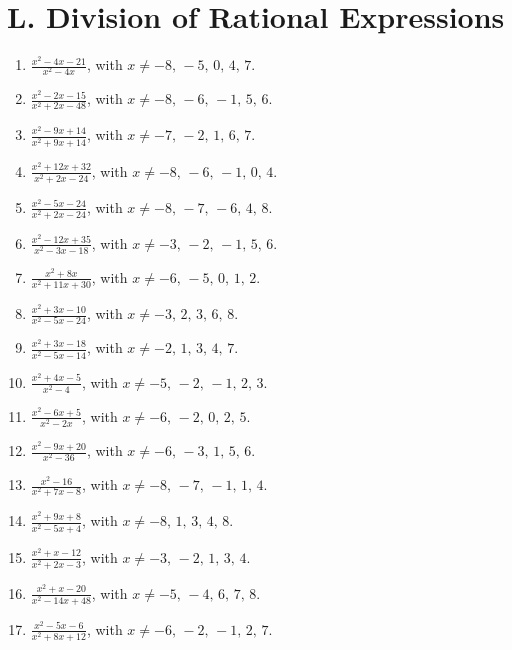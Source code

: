 \documentclass[11pt,oneside]{book}
\begin{document}
\section*{L. Division of Rational Expressions}
\begin{enumerate}[leftmargin=*,label=\textbf{L\arabic*.},itemsep=0.45\baselineskip]
\item $\displaystyle \frac{x^{2} - 4 x - 21}{x^{2} - 4 x}$, with $x\ne -8,\,-5,\,0,\,4,\,7$.
\item $\displaystyle \frac{x^{2} - 2 x - 15}{x^{2} + 2 x - 48}$, with $x\ne -8,\,-6,\,-1,\,5,\,6$.
\item $\displaystyle \frac{x^{2} - 9 x + 14}{x^{2} + 9 x + 14}$, with $x\ne -7,\,-2,\,1,\,6,\,7$.
\item $\displaystyle \frac{x^{2} + 12 x + 32}{x^{2} + 2 x - 24}$, with $x\ne -8,\,-6,\,-1,\,0,\,4$.
\item $\displaystyle \frac{x^{2} - 5 x - 24}{x^{2} + 2 x - 24}$, with $x\ne -8,\,-7,\,-6,\,4,\,8$.
\item $\displaystyle \frac{x^{2} - 12 x + 35}{x^{2} - 3 x - 18}$, with $x\ne -3,\,-2,\,-1,\,5,\,6$.
\item $\displaystyle \frac{x^{2} + 8 x}{x^{2} + 11 x + 30}$, with $x\ne -6,\,-5,\,0,\,1,\,2$.
\item $\displaystyle \frac{x^{2} + 3 x - 10}{x^{2} - 5 x - 24}$, with $x\ne -3,\,2,\,3,\,6,\,8$.
\item $\displaystyle \frac{x^{2} + 3 x - 18}{x^{2} - 5 x - 14}$, with $x\ne -2,\,1,\,3,\,4,\,7$.
\item $\displaystyle \frac{x^{2} + 4 x - 5}{x^{2} - 4}$, with $x\ne -5,\,-2,\,-1,\,2,\,3$.
\item $\displaystyle \frac{x^{2} - 6 x + 5}{x^{2} - 2 x}$, with $x\ne -6,\,-2,\,0,\,2,\,5$.
\item $\displaystyle \frac{x^{2} - 9 x + 20}{x^{2} - 36}$, with $x\ne -6,\,-3,\,1,\,5,\,6$.
\item $\displaystyle \frac{x^{2} - 16}{x^{2} + 7 x - 8}$, with $x\ne -8,\,-7,\,-1,\,1,\,4$.
\item $\displaystyle \frac{x^{2} + 9 x + 8}{x^{2} - 5 x + 4}$, with $x\ne -8,\,1,\,3,\,4,\,8$.
\item $\displaystyle \frac{x^{2} + x - 12}{x^{2} + 2 x - 3}$, with $x\ne -3,\,-2,\,1,\,3,\,4$.
\item $\displaystyle \frac{x^{2} + x - 20}{x^{2} - 14 x + 48}$, with $x\ne -5,\,-4,\,6,\,7,\,8$.
\item $\displaystyle \frac{x^{2} - 5 x - 6}{x^{2} + 8 x + 12}$, with $x\ne -6,\,-2,\,-1,\,2,\,7$.

\end{enumerate}
\end{document}
